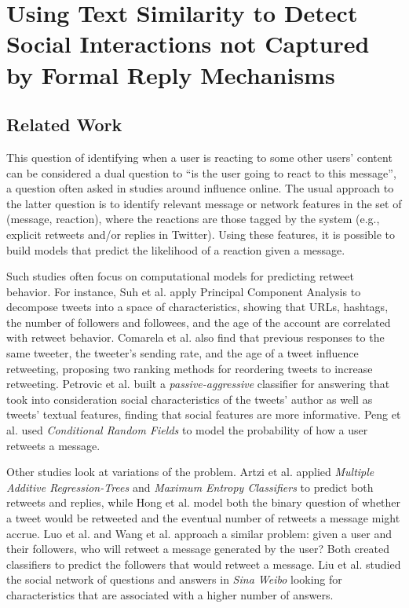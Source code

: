 \chapter{Using Text Similarity to Detect Social Interactions not Captured by Formal Reply Mechanisms}
\label{reactions}

\section{Related Work}

This question of identifying when a user is reacting to some other users' content can be considered a dual 
question to ``is the user going to react to this message'', a question often asked in studies around influence online. 
The usual approach to the latter question is to identify relevant message or network features in the set of (message, reaction), where the reactions are those tagged by the system (e.g., explicit retweets and/or replies in Twitter).  
Using these features, it is possible to build models that predict the likelihood of a reaction given a message.

Such studies often focus on computational models for predicting retweet behavior.  
For instance, Suh et al. \cite{Suh2010} apply Principal Component Analysis to decompose tweets into a space of characteristics, showing that URLs, hashtags, the number of followers and followees, and the age of the account are correlated with retweet behavior. 
Comarela et al. \cite{Comarela2012} also find that previous responses to the same tweeter, the tweeter's sending rate, and the age of a tweet influence retweeting, proposing two ranking methods for reordering tweets to increase retweeting.  
Petrovic et al. \cite{Petrovic2011} built a \textit{passive-aggressive} classifier for answering that took into consideration social characteristics of the tweets' author as well as tweets' textual features, finding that social features are more informative.  
Peng et al. \cite{Peng2011} used \textit{Conditional Random Fields} to model the probability of how a user retweets a message. 

Other studies look at variations of the problem.  
Artzi et al. \cite{Artzi2012} applied \textit{Multiple Additive Regression-Trees} and \textit{Maximum Entropy Classifiers} to predict both retweets and replies, while Hong et al. \cite{Hong2011} model both the binary question of whether a tweet would be retweeted and the eventual number of retweets a message might accrue.  
Luo et al. \cite{Luo2013} and Wang et al. \cite{Wang2012} approach a similar problem: given a user and their followers, who will retweet a message generated by the user?  Both created classifiers to predict the followers that would retweet a message.  
Liu et al. \cite{Liu2013} studied the social network of questions and answers in \textit{Sina Weibo} looking for characteristics that are associated with a higher number of answers.

